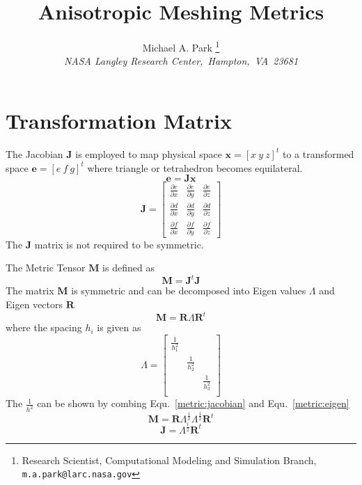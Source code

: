 \documentclass{article}
\title{Anisotropic Meshing Metrics}
\author{Michael A. Park
  \thanks{Research Scientist, Computational Modeling and Simulation Branch,
          \texttt{m.a.park@larc.nasa.gov}} \\
  {\itshape NASA Langley Research Center,~Hampton,~VA~23681}\\[5pt]
}
\begin{document}
\maketitle 

\section{Transformation Matrix}

The Jacobian $\mathbf{J}$ is employed to map physical space
$\mathbf{x}=\left[x ~y~z\right]^t$ to a transformed space
$\mathbf{e}=\left[e~f~g\right]^t$ where triangle or tetrahedron
becomes equilateral.
\begin{equation}\label{e:x}
 \mathbf{e}=\mathbf{J}\mathbf{x}
\end{equation}
\begin{equation}
 \mathbf{J}=\left[
 \begin{array}{ccc}
   \frac{\partial e}{\partial x}&
   \frac{\partial e}{\partial y}&
   \frac{\partial e}{\partial z}\\
   \frac{\partial d}{\partial x}&
   \frac{\partial d}{\partial y}&
   \frac{\partial d}{\partial z}\\
   \frac{\partial f}{\partial x}&
   \frac{\partial f}{\partial y}&
   \frac{\partial f}{\partial z}
 \end{array}\right]
\end{equation}
The $\mathbf{J}$ matrix is not required to be symmetric.

The Metric Tensor $\mathbf{M}$ is defined as 
\begin{equation}\label{metric:jacobian}
 \mathbf{M}=\mathbf{J}^t\mathbf{J}
\end{equation}
The matrix $\mathbf{M}$ is symmetric and can be decomposed into Eigen
values $\Lambda$ and Eigen vectors $\mathbf{R}$
\begin{equation}\label{metric:eigen}
 \mathbf{M}=\mathbf{R}\Lambda\mathbf{R}^t
\end{equation}
where the spacing $h_i$ is given as 
\begin{equation}
 \Lambda=\left[
 \begin{array}{ccc}
   \frac{1}{h_1^2}&&\\
   &\frac{1}{h_2^2}&\\
   &&\frac{1}{h_3^2}\\
 \end{array}\right]
\end{equation}
The $\frac{1}{h^2}$ can be shown by combing Equ.~\ref{metric:jacobian}
and Equ.~\ref{metric:eigen}
\begin{equation}
 \mathbf{M}=\mathbf{R}\Lambda^\frac{1}{2}\Lambda^\frac{1}{2}\mathbf{R}^t
\end{equation}
\begin{equation}
 \mathbf{J}=\Lambda^\frac{1}{2}\mathbf{R}^t
\end{equation}
\end{document}
